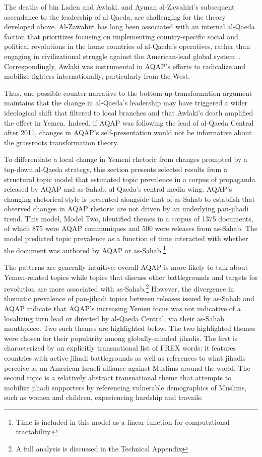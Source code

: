 The deaths of bin Laden and Awlaki, and Ayman al-Zawahiri's subsequent
ascendance to the leadership of al-Qaeda, are challenging for the theory
developed above. Al-Zawahiri has long been associated with an
internal al-Qaeda faction that prioritizes focusing on implementing
country-specific social and political revolutions in the home
countries of al-Qaeda's operatives, rather than engaging in
civilizational struggle against the American-lead global
system~\autocite[147]{miller2015audacious}. Correspondingly, Awlaki was
instrumental in AQAP's efforts to radicalize and mobilize fighters
internationally, particularly from the West.

Thus, one possible counter-narrative to the bottom-up transformation
argument maintains that the change in al-Qaeda's leadership may have triggered a wider ideological shift that filtered to local branches and that Awlaki's death amplified
the effect in Yemen. Indeed, if AQAP was following the lead of al-Qaeda Central after 2011, changes in AQAP's self-presentation would not be informative about the grassroots transformation theory.

To differentiate a local change in Yemeni rhetoric from changes prompted by a top-down al-Qaeda strategy, this section presents selected results from a structural topic model that estimated topic prevalence in a corpus of propaganda released by AQAP and as-Sahab, al-Qaeda's central media wing.  AQAP's changing rhetorical style is presented alongside that of as-Sahab to establish that observed changes in AQAP rhetoric are not driven by an underlying pan-jihadi trend. This model, Model Two, identified themes in a corpus of 1375 documents, of which 875 were AQAP communiques and 500 were  releases from as-Sahab. The model predicted topic prevalence as a function of time interacted with whether the document was authored by AQAP or as-Sahab.\footnote{Time is included in this model as a linear function for computational tractability.}

The patterns are generally intuitive: overall AQAP is more likely to talk about
Yemen-related topics while topics that discuss other battlegrounds and
targets for revolution are more associated with as-Sahab.\footnote{A
  full analysis is discussed in the Technical Appendix} However, the
divergence in thematic prevalence of pan-jihadi topics between
releases issued by as-Sahab and AQAP indicate that AQAP's increasing
Yemen focus was not indicative of a localizing turn lead or directed
by al-Qaeda Central, via their as-Sahab mouthpiece. Two such themes are highlighted below. The two highlighted themes were chosen for their popularity among globally-minded jihadis. The first is characterized by an explicitly transnational list of FREX words: it features countries with active jihadi battlegrounds as well as references to what jihadis perceive as an American-Israeli alliance against Muslims around the world. The second topic is a relatively abstract transnational theme that attempts to mobilize jihadi supporters by referencing vulnerable demographics of Muslims, such as women and children, experiencing hardship and travails.

